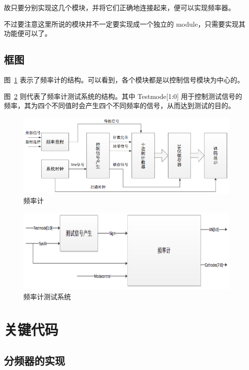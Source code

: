 \documentclass[11pt,a4paper]{article}
\begin{document}
故只要分别实现这几个模块，并将它们正确地连接起来，便可以实现频率器。

不过要注意这里所说的模块并不一定要实现成一个独立的 module，只需要实现其功能便可以了。

\subsection{框图}
图~\ref{fig:频率计} 表示了频率计的结构。可以看到，各个模块都是以控制信号模块为中心的。

图~\ref{fig:频率计测试系统} 则代表了频率计测试系统的结构。其中 Testmode[1:0] 用于控制测试信号的频率，其为四个不同值时会产生四个不同频率的信号，从而达到测试的目的。

\begin{figure}[htb]
  \centering
    \includegraphics[width=\textwidth]{exp3_freq_meter}
  \caption{频率计}
  \label{fig:频率计}
\end{figure}

\begin{figure}[htb]
  \centering
    \includegraphics[width=\textwidth]{exp3_freq_meter_tb}
  \caption{频率计测试系统}
  \label{fig:频率计测试系统}
\end{figure}

\section{关键代码}

\subsection{分频器的实现}
\end{document}
